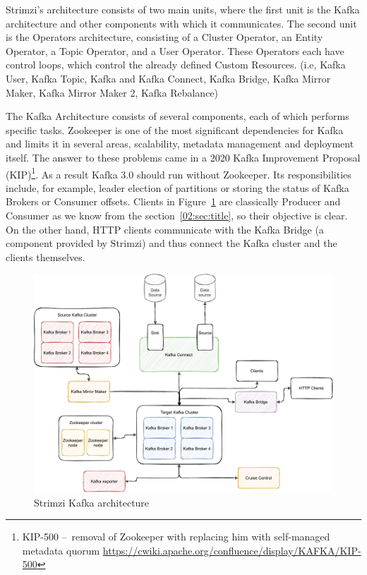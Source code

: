 Strimzi's architecture consists of two main units, where the first unit is the Kafka architecture and other components with which it communicates.
The second unit is the Operators architecture, consisting of a Cluster Operator, an Entity Operator, a Topic Operator, and a User Operator.
These Operators each have control loops, which control the already defined Custom Resources. (i.e, Kafka User, Kafka Topic, Kafka and Kafka Connect, Kafka Bridge, Kafka Mirror Maker, Kafka Mirror Maker 2, Kafka Rebalance)

The Kafka Architecture consists of several components, each of which performs specific tasks.
Zookeeper is one of the most significant dependencies for Kafka and limits it in several areas, scalability, metadata management and deployment itself.
The answer to these problems came in a 2020 Kafka Improvement Proposal (KIP)\footnote{KIP-500 \---\ removal of Zookeeper with replacing him with self-managed metadata quorum \url{https://cwiki.apache.org/confluence/display/KAFKA/KIP-500}}.
As a result Kafka 3.0 should run without Zookeeper.
Its responsibilities include, for example, leader election of partitions or storing the status of Kafka Brokers or Consumer offsets.
Clients in Figure~\ref{03:fig:strimziKafkaArchitecture} are classically Producer and Consumer as we know from the section~\ref{02:sec:title}, so their objective is clear.
On the other hand, HTTP clients communicate with the Kafka Bridge (a component provided by Strimzi) and thus connect the Kafka cluster and the clients themselves.
\begin{figure}[!ht]
    \centering
    \includegraphics[scale=0.75]{obrazky-figures/02-preliminaries/03-strimzi/03-strimzi-kafka-architecture (1)}
    \caption{Strimzi Kafka architecture}
    \label{03:fig:strimziKafkaArchitecture}
\end{figure}
